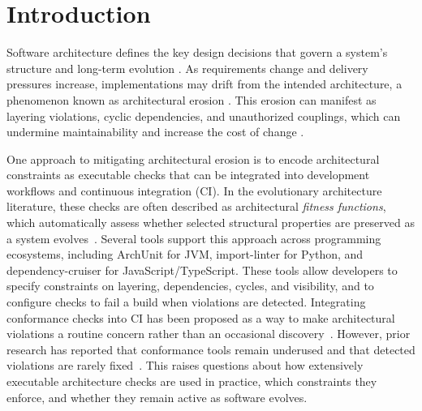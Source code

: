 \section{Introduction}\label{sec:introduction}

Software architecture defines the key design decisions that govern
a system's structure and long-term evolution
\cite{bass2012,perry1992}. As requirements change and delivery
pressures increase, implementations may drift from the intended
architecture, a phenomenon known as architectural erosion
\cite{desilva2012,perry1992}. This erosion can manifest as layering
violations, cyclic dependencies, and unauthorized couplings, which
can undermine maintainability and increase the cost of change
\cite{passos2010,desilva2012}.

One approach to mitigating architectural erosion is
to encode architectural constraints as executable 
checks that can be integrated into development
workflows and continuous integration (CI). 
In the evolutionary architecture
literature, these checks are often described 
as architectural \emph{fitness functions}, 
which automatically assess whether selected
structural properties are preserved as a system 
evolves~\cite{ford2017}.
Several tools support this approach across 
programming ecosystems, including
ArchUnit for JVM, import-linter for Python, 
and dependency-cruiser for
JavaScript/TypeScript.
These tools allow developers to specify constraints
on layering, dependencies, cycles, and visibility, 
and to configure checks
to fail a build when violations are detected. 
Integrating conformance
checks into CI has been proposed as a way to 
make architectural violations
a routine concern rather than an occasional 
discovery~\cite{pinto2017}.
However, prior research has reported that 
conformance tools remain
underused and that detected violations are rarely 
fixed~\cite{passos2010}.
This raises questions about how extensively 
executable architecture checks
are used in practice, which constraints they 
enforce, and whether they
remain active as software evolves.

